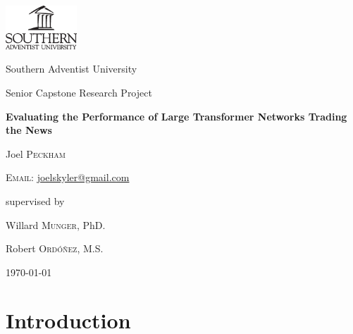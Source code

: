 \documentclass[conference]{IEEEtran}
\begin{document}
\begin{titlepage}
    \centering
    \includegraphics[width=0.2\textwidth]{logoBlackV.eps}\par
    \vspace{1.5cm}
    {\LARGE Southern Adventist University \par}
    \vfill
    {\Large Senior Capstone Research Project\par}
    \vspace{1cm}
    {\huge\bfseries Evaluating the Performance of Large Transformer Networks Trading the News\par}
    \vspace{1cm}
    {\large Joel \textsc{Peckham}\par}
    \textsc{Email:} \href{mailto:joelskyler@gmail.com}{joelskyler@gmail.com}\par
    
    \vspace{0.5cm}
    supervised by\par
    Willard \textsc{Munger}, PhD.\par
    Robert \textsc{Ordóñez}, M.S.
    \vfill
    \begin{abstract}
        We explore the viability of using GPT-J, a 6 billion parameter natural language processing model, as a stock market trading indicator. This novel approach leverages both GPT-J's ability to process large, data-rich inputs and GPT-J's deep understanding of the world. We test the performance of both the raw GPT-J-6B weights and our own custom fine-tuned model. Given our data and testing methodology, we found that neither the raw weights nor the fine-tuned model could perform better than random when predicting the direction of movement of a given stock.
    \end{abstract}
    
    \vfill

    {\large \today\par}
\end{titlepage}
\onecolumn
\tableofcontents
\listoffigures
\listoftables
\twocolumn
\thispagestyle{plain}
\pagestyle{plain}
\section{Introduction}
\end{document}
